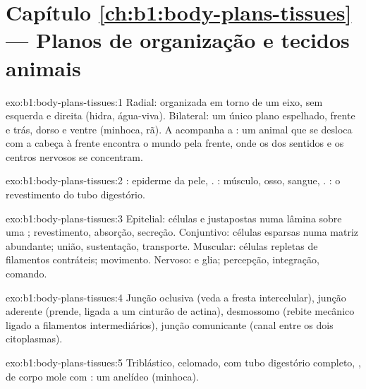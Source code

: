 \section*{Capítulo \ref{ch:b1:body-plans-tissues} --- Planos de organização e tecidos animais}

\begin{solution}{exo:b1:body-plans-tissues:1}
Radial: organizada em torno de um eixo, sem esquerda e direita (hidra,
água-viva). Bilateral: um único plano espelhado, frente e trás, dorso e
ventre (minhoca, rã). A  acompanha a : um
animal que se desloca com a cabeça à frente encontra o mundo pela
frente, onde os  dos sentidos e os centros nervosos se concentram.
\end{solution}

\begin{solution}{exo:b1:body-plans-tissues:2}
: epiderme da pele, . : músculo, osso,
sangue, . : o revestimento do tubo digestório.
\end{solution}

\begin{solution}{exo:b1:body-plans-tissues:3}
Epitelial: células  e justapostas numa lâmina sobre uma
; revestimento, absorção, secreção. Conjuntivo: células
esparsas numa matriz abundante; união, sustentação, transporte.
Muscular: células repletas de filamentos contráteis; movimento. Nervoso:
 e glia; percepção, integração, comando.
\end{solution}

\begin{solution}{exo:b1:body-plans-tissues:4}
Junção oclusiva (veda a fresta intercelular), junção aderente (prende,
ligada a um cinturão de actina), desmossomo (rebite mecânico ligado a
filamentos intermediários), junção comunicante (canal entre os dois
citoplasmas).
\end{solution}

\begin{solution}{exo:b1:body-plans-tissues:5}
Triblástico, celomado, com tubo digestório completo, , de
corpo mole com : um anelídeo (minhoca).
\end{solution}

